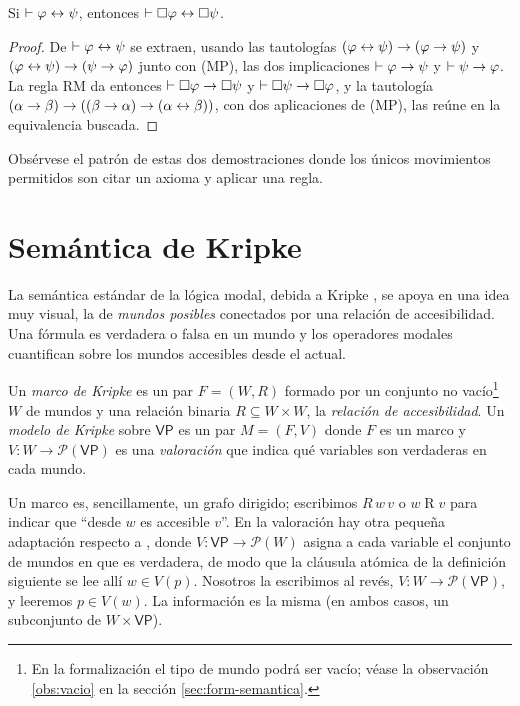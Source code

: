 \begin{proposicion}\label{prop:re}
Si\/ $\vdash \varphi \leftrightarrow \psi$, entonces
$\vdash \square\varphi \leftrightarrow \square\psi$.
\end{proposicion}
\begin{proof}
De $\vdash \varphi \leftrightarrow \psi$ se extraen, usando las tautologías $(\varphi \leftrightarrow \psi) \to (\varphi \to \psi)$ y $(\varphi \leftrightarrow \psi) \to (\psi \to \varphi)$ junto con (MP), las dos implicaciones $\vdash \varphi \to \psi$ y $\vdash \psi \to \varphi$. La regla RM da entonces $\vdash \square\varphi \to \square\psi$ y $\vdash \square\psi \to \square\varphi$, y la tautología $(\alpha \to \beta) \to ((\beta \to \alpha) \to (\alpha \leftrightarrow \beta))$, con dos aplicaciones de (MP), las reúne en la equivalencia buscada.
\end{proof}

Obsérvese el patrón de estas dos demostraciones donde los únicos movimientos permitidos son citar un axioma y aplicar una regla.

\section{Semántica de Kripke}\label{sec:kripke-mat}

La semántica estándar de la lógica modal, debida a Kripke \cite{kripke}, se apoya en una idea muy visual, la de \emph{mundos posibles} conectados por una relación de accesibilidad. Una fórmula es verdadera o falsa en un mundo y los operadores modales cuantifican sobre los mundos accesibles desde el actual.

\begin{definicion}\label{def:kripke}
Un \emph{marco de Kripke} es un par $F = (W, R)$ formado por un conjunto no vacío\footnote{En la formalización el tipo de mundo podrá ser vacío; véase la observación \ref{obs:vacio} en la sección \ref{sec:form-semantica}.} $W$ de mundos y una relación binaria $R \subseteq W \times W$, la \emph{relación de accesibilidad}. Un \emph{modelo de Kripke} sobre $\mathsf{VP}$ es un par $M = (F, V)$ donde $F$ es un marco y $V \colon W \to \mathcal{P}(\mathsf{VP})$ es una \emph{valoración} que indica qué variables son verdaderas en cada mundo.
\end{definicion}

Un marco es, sencillamente, un grafo dirigido; escribimos $R\,w\,v$ o $w \mathrel{R} v$ para indicar que ``desde $w$ es accesible $v$''. En la valoración hay otra pequeña adaptación respecto a \cite[Def.~1.19]{blackburn}, donde $V \colon \mathsf{VP} \to \mathcal{P}(W)$ asigna a cada variable el conjunto de mundos en que es verdadera, de modo que la cláusula atómica de la definición siguiente se lee allí $w \in V(p)$. Nosotros la escribimos al revés, $V \colon W \to \mathcal{P}(\mathsf{VP})$, y leeremos $p \in V(w)$. La información es la misma (en ambos casos, un subconjunto de $W \times \mathsf{VP}$).

